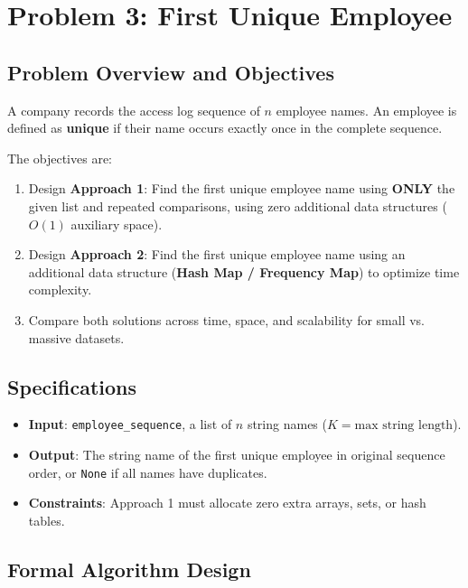 \section{Problem 3: First Unique Employee}

\subsection{Problem Overview and Objectives}
A company records the access log sequence of $n$ employee names. An employee is defined as \textbf{unique} if their name occurs exactly once in the complete sequence.

The objectives are:
\begin{enumerate}
    \item Design \textbf{Approach 1}: Find the first unique employee name using \textbf{ONLY} the given list and repeated comparisons, using zero additional data structures ($O(1)$ auxiliary space).
    \item Design \textbf{Approach 2}: Find the first unique employee name using an additional data structure (\textbf{Hash Map / Frequency Map}) to optimize time complexity.
    \item Compare both solutions across time, space, and scalability for small vs. massive datasets.
\end{enumerate}

\subsection{Specifications}
\begin{itemize}
    \item \textbf{Input}: \texttt{employee\_sequence}, a list of $n$ string names ($K = \text{max string length}$).
    \item \textbf{Output}: The string name of the first unique employee in original sequence order, or \texttt{None} if all names have duplicates.
    \item \textbf{Constraints}: Approach 1 must allocate zero extra arrays, sets, or hash tables.
\end{itemize}

\subsection{Formal Algorithm Design}

